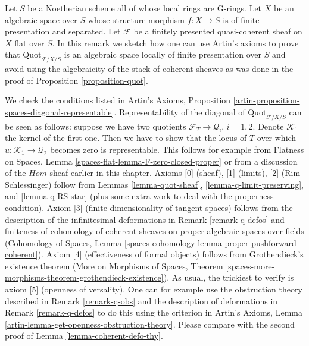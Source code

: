 \begin{remark}
\label{remark-quot-via-artins-axioms}
Let $S$ be a Noetherian scheme all of whose local rings are G-rings.
Let $X$ be an algebraic space over $S$ whose structure morphism
$f : X \to S$ is of finite presentation and separated.
Let $\mathcal{F}$ be a finitely presented quasi-coherent sheaf
on $X$ flat over $S$. In this remark we sketch how one can
use Artin's axioms to prove that $\text{Quot}_{\mathcal{F}/X/S}$
is an algebraic space locally of finite presentation over $S$
and avoid using the algebraicity of the stack of coherent sheaves
as was done in the proof of Proposition \ref{proposition-quot}.

\medskip\noindent
We check the conditions listed in Artin's Axioms, Proposition
\ref{artin-proposition-spaces-diagonal-representable}.
Representability of the diagonal of $\text{Quot}_{\mathcal{F}/X/S}$
can be seen as follows: suppose we have two quotients
$\mathcal{F}_T \to \mathcal{Q}_i$, $i = 1, 2$. Denote
$\mathcal{K}_1$ the kernel of the first one. Then we have
to show that the locus of $T$ over which
$u : \mathcal{K}_1 \to \mathcal{Q}_2$ becomes zero is representable.
This follows for example from Flatness on Spaces, Lemma
\ref{spaces-flat-lemma-F-zero-closed-proper}
or from a discussion of the $\mathit{Hom}$ sheaf earlier
in this chapter. Axioms [0] (sheaf), [1] (limits), [2] (Rim-Schlessinger)
follow from Lemmas \ref{lemma-quot-sheaf},
\ref{lemma-q-limit-preserving}, and \ref{lemma-q-RS-star}
(plus some extra work to deal with the properness condition).
Axiom [3] (finite dimensionality of tangent spaces)
follows from the description of the infinitesimal
deformations in Remark \ref{remark-q-defos}
and finiteness of cohomology of coherent sheaves on proper
algebraic spaces over fields (Cohomology of Spaces, Lemma
\ref{spaces-cohomology-lemma-proper-pushforward-coherent}).
Axiom [4] (effectiveness of formal objects)
follows from Grothendieck's existence theorem
(More on Morphisms of Spaces, Theorem
\ref{spaces-more-morphisms-theorem-grothendieck-existence}).
As usual, the trickiest to verify is axiom [5] (openness of versality).
One can for example use the obstruction theory described
in Remark \ref{remark-q-obs} and the description of
deformations in Remark \ref{remark-q-defos}
to do this using the criterion in
Artin's Axioms, Lemma \ref{artin-lemma-get-openness-obstruction-theory}.
Please compare with the second proof of
Lemma \ref{lemma-coherent-defo-thy}.
\end{remark}









